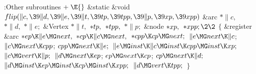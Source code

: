 \Y\B\4:Other subroutines\X${}\mathrel+\E{}$\6
\1\1\&{static} \&{void} ${}\\{flip}(\|c,\39\|d,\39\|e,\39\|t,\39\\{tp},\39%
\\{tpp},\39\|p,\39\\{xp},\39\\{xpp}){}$\6
\&{arc} ${}{*}\|c,{}$ ${}{*}\|d,{}$ ${}{*}\|e;{}$\6
\&{Vertex} ${}{*}\|t,{}$ ${}{*}\\{tp},{}$ ${}{*}\\{tpp},{}$ ${}{*}\|p;{}$\6
\&{node} ${}{*}\\{xp},{}$ ${}{*}\\{xpp};\2\2{}$\6
${}\{{}$\5
\1\&{register} \&{arc} ${}{*}\\{ep}\K\|e\MG\\{next},{}$ ${}{*}\\{cp}\K\|c\MG%
\\{next},{}$ ${}{*}\\{cpp}\K\\{cp}\MG\\{next};{}$\7
${}\|e\MG\\{next}\K\|c{}$;\5
${}\|c\MG\\{next}\K\\{cpp}{}$;\5
${}\\{cpp}\MG\\{next}\K\|e;{}$\6
${}\|e\MG\\{inst}\K\|c\MG\\{inst}\K\\{cpp}\MG\\{inst}\K\\{xp};{}$\6
${}\|c\MG\\{vert}\K\|p;{}$\6
${}\|d\MG\\{next}\K\\{ep}{}$;\5
${}\\{ep}\MG\\{next}\K\\{cp}{}$;\5
${}\\{cp}\MG\\{next}\K\|d;{}$\6
${}\|d\MG\\{inst}\K\\{ep}\MG\\{inst}\K\\{cp}\MG\\{inst}\K\\{xpp};{}$\6
${}\|d\MG\\{vert}\K\\{tpp};{}$\6
\4${}\}{}$\2\par
\fi

